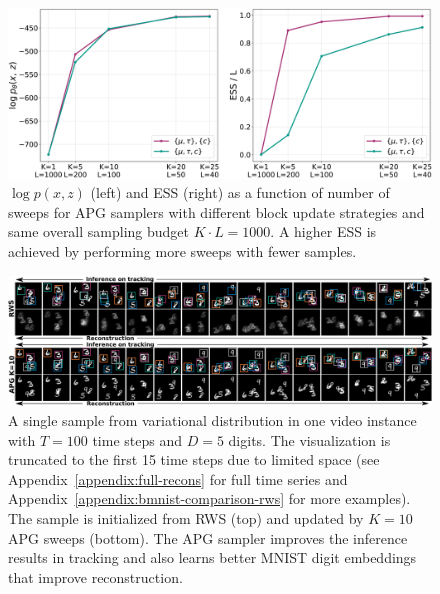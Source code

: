 \documentclass{article}
\theoremstyle{definition}
\begin{document}
\begin{figure}[t!]
\centering
\includegraphics[width=\columnwidth]{figures/budget_gmm.pdf}
  \caption{$\log p(x, z)$ (left) and ESS (right) as a function of number of sweeps for APG samplers with different block update strategies and same overall sampling budget $K \cdot L = 1000$. A higher ESS is achieved by performing more sweeps with fewer samples.}
  \label{fig:fixed-budget-gmm}
\end{figure}

\begin{figure}[!t]
  \centering
  \includegraphics[width=1.0\textwidth]{figures/bmnist-5digits-samples-with-rws.pdf}
  \caption{A single sample from variational distribution in one video instance with $T=100$ time steps and $D=5$ digits. The visualization is truncated to the first 15 time steps due to limited space (see Appendix~\ref{appendix:full-recons} for full time series and Appendix~\ref{appendix:bmnist-comparison-rws} for more examples). The sample is initialized from RWS (top) and updated by $K=10$ APG sweeps (bottom). The APG sampler improves the inference results in tracking and also learns better MNIST digit embeddings that improve reconstruction.}
  \label{mnist-qualitative}
\end{figure}
\end{document}
